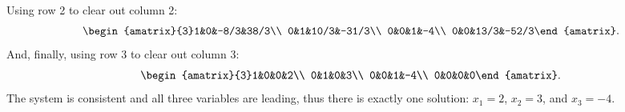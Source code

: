 \begin{SaveQuestion}
Using row 2 to clear out column 2:
\[\begin{amatrix}{3}1&0&-8/3&38/3\\ 0&1&10/3&-31/3\\ 0&0&1&-4\\ 0&0&13/3&-52/3\end{amatrix}.\]
And, finally, using row 3 to clear out column 3:
\[\begin{amatrix}{3}1&0&0&2\\ 0&1&0&3\\ 0&0&1&-4\\ 0&0&0&0\end{amatrix}.\]
The system is consistent and all three variables are leading, thus there is exactly one solution: $x_1=2$, $x_2=3$, and $x_3=-4$.
\end{SaveQuestion}


